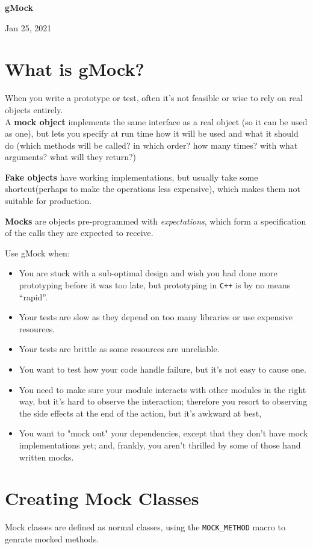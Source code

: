 \documentclass[letterpaper,11pt]{report}
\newcommand{\coursetopic}{gMock}
\newcommand{\thedate}{Jan 25, 2021}
\begin{document}
\begin{center}{\huge \bfseries \coursetopic}\end{center}  %
\begin{flushright}\thedate\end{flushright} %

\section*{What is gMock?}
When you write a prototype or test, often it's not feasible or wise to rely on real objects 
entirely.\\
A \textbf{mock object} implements the same interface as a real object (so it can be used as one),
but lets you specify at run time how it will be used and what it should do (which methods will be
called? in which order? how many times? with what arguments? what will they return?)

\textbf{Fake objects} have working implementations, but usually take some shortcut(perhaps to make 
the operations less expensive), which makes them not suitable for production.

\textbf{Mocks} are objects pre-programmed with \textit{expectations},
 which form a specification of the calls they are expected to receive.

Use gMock when:
\begin{itemize}
    \item You are stuck with a sub-optimal design and wish you had done more prototyping before it
        was too late, but prototyping in \texttt{C++} is by no means ``rapid''.
    \item Your tests are slow as they depend on too many libraries or use expensive resources.
    \item Your tests are brittle as some resources are unreliable.
    \item You want to test how your code handle failure, but it's not easy to cause one.
    \item You need to make sure your module interacts with other modules in the right way, but it's
        hard to observe the interaction; therefore you resort to observing the side effects at the
        end of the action, but it's awkward at best,
    \item You want to "mock out" your dependencies, except that they don't have mock implementations
        yet; and, frankly, you aren't thrilled by some of those hand written mocks.
\end{itemize}

\section*{Creating Mock Classes}
Mock classes are defined as normal classes, using the \texttt{MOCK\_METHOD} macro to genrate mocked
methods.
\end{document}
